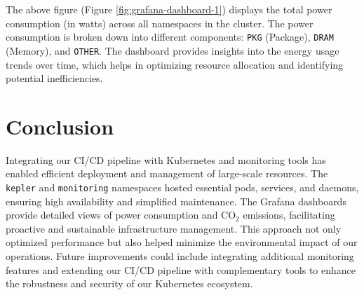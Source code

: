 The above figure (Figure \ref{fig:grafana-dashboard-1}) displays the total power consumption (in watts) across all namespaces in the cluster. The power consumption is broken down into different components: \texttt{PKG} (Package), \texttt{DRAM} (Memory), and \texttt{OTHER}. The dashboard provides insights into the energy usage trends over time, which helps in optimizing resource allocation and identifying potential inefficiencies.



\newpage

\section{Conclusion}

Integrating our CI/CD pipeline with Kubernetes and monitoring tools has enabled efficient deployment and management of large-scale resources. The \texttt{kepler} and \texttt{monitoring} namespaces hosted essential pods, services, and daemons, ensuring high availability and simplified maintenance.
The Grafana dashboards provide detailed views of power consumption and CO$_2$ emissions, facilitating proactive and sustainable infrastructure management. This approach not only optimized performance but also helped minimize the environmental impact of our operations.
Future improvements could include integrating additional monitoring features and extending our CI/CD pipeline with complementary tools to enhance the robustness and security of our Kubernetes ecosystem.

\pagebreak